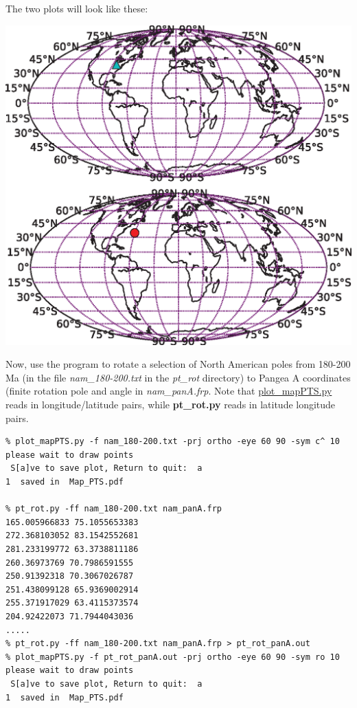\documentclass[11pt]{book}
\begin{document}
{{The two plots will look like these:

\includegraphics[width=15cm]{EPSfiles/pt_rot.eps}




Now, use the program to rotate a selection of North American poles from 180-200 Ma (in the file {\it nam\_180-200.txt} in the {\it pt\_rot} directory) to Pangea A coordinates (finite rotation pole and angle in {\it nam\_panA.frp}.   Note that \href{#plot_mapPTS.py}{plot\_mapPTS.py} reads in longitude/latitude pairs, while {\bf pt\_rot.py} reads in latitude longitude pairs.

\begin{verbatim}
% plot_mapPTS.py -f nam_180-200.txt -prj ortho -eye 60 90 -sym c^ 10
please wait to draw points
 S[a]ve to save plot, Return to quit:  a
1  saved in  Map_PTS.pdf

% pt_rot.py -ff nam_180-200.txt nam_panA.frp
165.005966833 75.1055653383
272.368103052 83.1542552681
281.233199772 63.3738811186
260.36973769 70.7986591555
250.91392318 70.3067026787
251.438099128 65.9369002914
255.371917029 63.4115373574
204.92422073 71.7944043036
.....
% pt_rot.py -ff nam_180-200.txt nam_panA.frp > pt_rot_panA.out
% plot_mapPTS.py -f pt_rot_panA.out -prj ortho -eye 60 90 -sym ro 10
please wait to draw points
 S[a]ve to save plot, Return to quit:  a
1  saved in  Map_PTS.pdf
\end{verbatim}

}}
\end{document}
